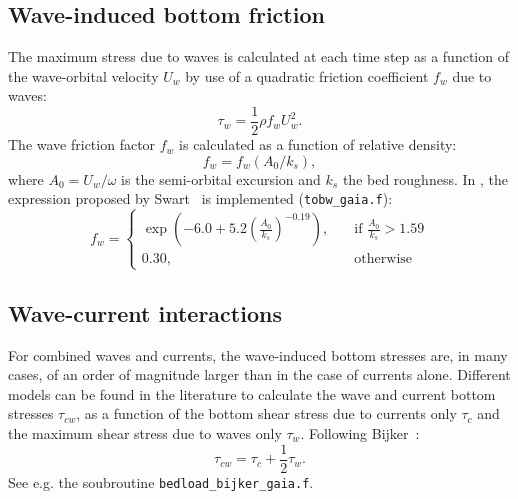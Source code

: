 \subsection{Wave-induced bottom friction}
The maximum stress due to waves is calculated at each time step as a
function of the wave-orbital velocity $U_w$ by use of a quadratic
friction coefficient $f_w$ due to waves:
\begin{equation*}
  \tau_w = \frac{1}{2}\rho f_w U_w^2.
\end{equation*}
The wave friction factor $f_w$ is calculated as a function of relative
density:
\begin{equation*}
f_w = f_w \left( A_0/k_s \right),
\end{equation*}
where $A_0= U_w/\omega$ is the semi-orbital excursion and $k_s$ the bed roughness.
In \gaia{}, the expression proposed by Swart~\cite{Swart} is implemented (\texttt{tobw\_gaia.f}):
\begin{equation*}
f_w = \left\{\begin{array}{ll}
\exp \left(-6.0 + 5.2\left( \frac{A_0}{k_s} \right)^{-0.19}\right), & \quad \text{if } \frac{A_0}{k_s} > 1.59\\
0.30, & \quad \text{otherwise}
\end{array}
\right.
\end{equation*}

\subsection{Wave-current interactions}
For combined waves and currents, the wave-induced bottom
stresses are, in many cases, of an order of magnitude larger than in the case of currents
alone. Different models can be found in the literature to calculate the wave
and current bottom stresses $\tau_{cw}$, as a function of the bottom
shear stress due to currents only $\tau_c$ and the maximum shear
stress due to waves only $\tau_w$. Following Bijker~\cite{Bijker}:
\begin{equation}\label{eq:tauBijker}
\tau_{cw} = \tau_c + \frac{1}{2} \tau_w.
\end{equation}
See e.g. the soubroutine \texttt{bedload\_bijker\_gaia.f}.


